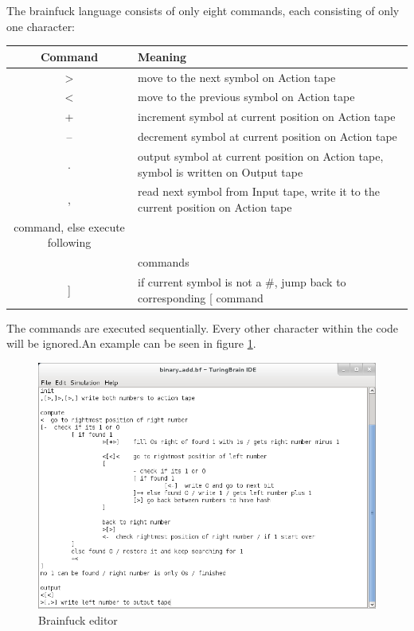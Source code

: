 \documentclass[%
  a4paper,%
  11pt,%
  blue,%
  hyperref	%
  ]{tubsartcl}
\begin{document}
The brainfuck language consists of only eight commands, each consisting of only one character:\\

\begin{tabular}{|c|l|}
\hline
\textbf{Command} & \textbf{Meaning} \\
\hline
$>$ & move to the next symbol on Action tape \\
\hline
$<$ & move to the previous symbol on Action tape \\
\hline
+ & increment symbol at current position on Action tape \\
\hline
-- & decrement symbol at current position on Action tape \\
\hline
. & output symbol at current position on Action tape, symbol is written on Output tape \\
\hline
, & read next symbol from Input tape, write it to the current position on Action tape \\
\hline
[ & if current symbol is a \#, move to corresponding ] command, else execute following\\
\ & commands \\
\hline
] & if current symbol is not a \#, jump back to corresponding [ command \\
\hline
\end{tabular}

\bigskip
The commands are executed sequentially. Every other character within the code will be ignored.An example can be seen in figure \ref{pic:brainfuck_editor}.

\begin{figure}[!htb]
\begin{center}
\includegraphics[scale=0.5]{graphics_gui/brainfuck_editor.png}
\end{center}
\caption{Brainfuck editor}
\label{pic:brainfuck_editor}
\end{figure}
\end{document}
